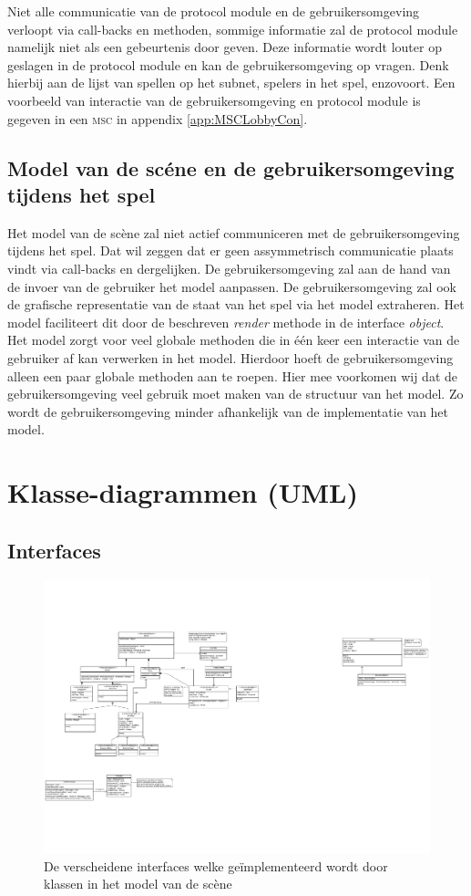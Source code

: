 \documentclass[a4paper,11pt]{article}
\begin{document}
    Niet alle communicatie van de protocol module en de gebruikersomgeving verloopt via call-backs en methoden, sommige informatie zal de protocol module namelijk niet als een gebeurtenis door geven. Deze informatie wordt louter op geslagen in de protocol module en kan de gebruikersomgeving op vragen. Denk hierbij aan de lijst van spellen op het subnet, spelers in het spel, enzovoort. Een voorbeeld van interactie van de gebruikersomgeving en protocol module is gegeven in een \textsc{msc} in appendix \ref{app:MSCLobbyCon}.
    \subsection{Model van de sc\'ene en de gebruikersomgeving tijdens het spel}
    Het model van de sc\`ene zal niet actief communiceren met de gebruikersomgeving tijdens het spel. Dat wil zeggen dat er geen assymmetrisch communicatie plaats vindt via call-backs en dergelijken. De gebruikersomgeving zal aan de hand van de invoer van de gebruiker het model aanpassen. De gebruikersomgeving zal ook de grafische representatie van de staat van het spel via het model extraheren. Het model faciliteert dit door de beschreven \emph{render} methode in de interface \emph{object}. Het model zorgt voor veel globale methoden die in \'e\'en keer een interactie van de gebruiker af kan verwerken in het model. Hierdoor hoeft de gebruikersomgeving alleen een paar globale methoden aan te roepen. Hier mee voorkomen wij dat de gebruikersomgeving veel gebruik moet maken van de structuur van het model. Zo wordt de gebruikersomgeving minder afhankelijk van de implementatie van het model.
    
    
    \label{sec:interactscenmodel}
    \newpage
    \appendix
    \section{Klasse-diagrammen (UML)}
    \subsection{Interfaces}
    \begin{figure}[h]
    \centering
    	\includegraphics{../Class-diagram/Interfaces.pdf}
    	\caption{De verscheidene interfaces welke ge\"implementeerd wordt door klassen in het model van de sc\`ene}
    \end{figure}
    \label{app:Interfaces}
    \FloatBarrier
\end{document}
